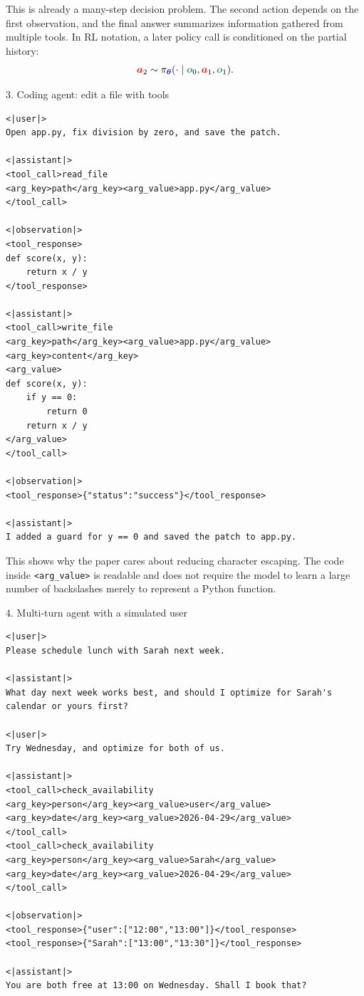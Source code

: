 \documentclass{article}
\newcommand{\colsym}[2]{\ensuremath{\textcolor{#1}{\boldsymbol{#2}}}}
\newcommand{\action}{\colsym{red}{a}}
\newcommand{\obs}{\colsym{ForestGreen}{o}}
\newcommand{\params}{\colsym{blue}{\theta}}
\begin{document}
This is already a many-step decision problem. The second action depends on the first observation, and the final answer summarizes information gathered from multiple tools.
In RL notation, a later policy call is conditioned on the partial history:
\[
    {\action}_2 \sim \pi_{\params}(\cdot \mid {\obs}_0,{\action}_1,{\obs}_1).
\]

\begin{examplebox}{3. Coding agent: edit a file with tools}
\begin{lstlisting}
<|user|>
Open app.py, fix division by zero, and save the patch.

<|assistant|>
<tool_call>read_file
<arg_key>path</arg_key><arg_value>app.py</arg_value>
</tool_call>

<|observation|>
<tool_response>
def score(x, y):
    return x / y
</tool_response>

<|assistant|>
<tool_call>write_file
<arg_key>path</arg_key><arg_value>app.py</arg_value>
<arg_key>content</arg_key>
<arg_value>
def score(x, y):
    if y == 0:
        return 0
    return x / y
</arg_value>
</tool_call>

<|observation|>
<tool_response>{"status":"success"}</tool_response>

<|assistant|>
I added a guard for y == 0 and saved the patch to app.py.
\end{lstlisting}
\end{examplebox}

This shows why the paper cares about reducing character escaping. The code inside \texttt{<arg\_value>} is readable and does not require the model to learn a large number of backslashes merely to represent a Python function.

\begin{examplebox}{4. Multi-turn agent with a simulated user}
\begin{lstlisting}
<|user|>
Please schedule lunch with Sarah next week.

<|assistant|>
What day next week works best, and should I optimize for Sarah's calendar or yours first?

<|user|>
Try Wednesday, and optimize for both of us.

<|assistant|>
<tool_call>check_availability
<arg_key>person</arg_key><arg_value>user</arg_value>
<arg_key>date</arg_key><arg_value>2026-04-29</arg_value>
</tool_call>
<tool_call>check_availability
<arg_key>person</arg_key><arg_value>Sarah</arg_value>
<arg_key>date</arg_key><arg_value>2026-04-29</arg_value>
</tool_call>

<|observation|>
<tool_response>{"user":["12:00","13:00"]}</tool_response>
<tool_response>{"Sarah":["13:00","13:30"]}</tool_response>

<|assistant|>
You are both free at 13:00 on Wednesday. Shall I book that?
\end{lstlisting}
\end{examplebox}
\end{document}
